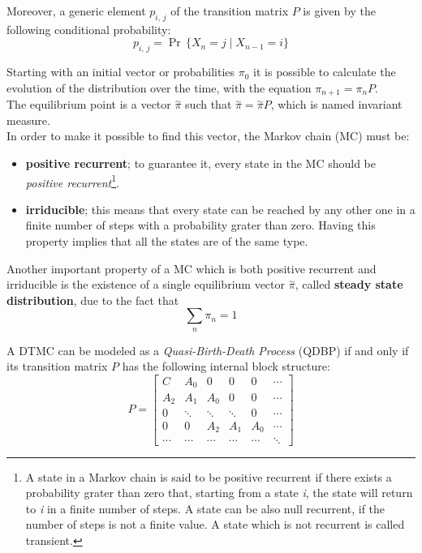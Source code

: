 Moreover, a generic element \(p_{i,\,j}\) of the transition matrix \( P \) is given by the following conditional probability:
\begin{equation*}
  p_{i,\,j} = \Pr\,\{X_{n} = j \mid X_{n-1} = i\}
\end{equation*}

Starting with an initial vector or probabilities \( \pi_{0} \) it is possible to calculate the evolution of the distribution over the time, with the equation \( \pi_{n+1} = \pi_{n}P \).\\
The equilibrium point is a vector \( \overset{\sim}{\pi} \) such that \( \overset{\sim}{\pi} = \overset{\sim}{\pi}P \), which is named invariant measure.\\
In order to make it possible to find this vector, the Markov chain (MC) must be:
\begin{itemize}
  \item \textbf{positive recurrent}; to guarantee it, every state in the MC should be \emph{positive recurrent}\footnote{A state in a Markov chain is said to be positive recurrent if there exists a probability grater than zero that, starting from a state \emph{i}, the state will return to \emph{i} in a finite number of steps. A state can be also null recurrent, if the number of steps is not a finite value. A state which is not recurrent is called transient.}. 
  \item \textbf{irriducible}; this means that every state can be reached by any other one in a finite number of steps with a probability grater than zero. Having this property implies that all the states are of the same type.  
\end{itemize}

Another important property of a MC which is both positive recurrent and irriducible is the existence of a single equilibrium vector \( \overset{\sim}{\pi} \), called \textbf{steady state distribution}, due to the fact that
\begin{equation*}
  \displaystyle\sum_{n} \pi_{n} = 1
\end{equation*}

A DTMC can be modeled as a \emph{Quasi-Birth-Death Process} (QDBP) if and only if its transition matrix \( P \) has the following internal block structure:
\begin{equation*} \label{transitionmatrix}
  P = 
  \begin{bmatrix}
    C & A_{0} & 0 & 0 & 0 & \cdots \\
    A_{2} & A_{1} & A_{0} & 0 & 0 & \cdots \\
    0 & \ddots & \ddots & \ddots & 0 & \cdots \\
    0 & 0 & A_{2} & A_{1} & A_{0} & \cdots \\
    \cdots & \cdots & \cdots & \cdots & \cdots & \ddots
  \end{bmatrix}
\end{equation*}

